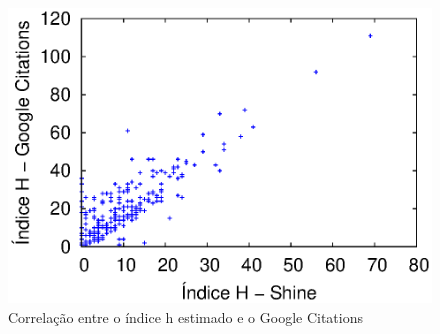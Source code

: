 \begin{figure}[!htb]
\centering
\includegraphics[scale=1]{../graficos/hindex/pt_BR/hindex_scatter_plot.eps}
\caption{Correlação entre o índice h estimado e o Google Citations}
\label{fig:hindex_scatter_plot}
\end{figure}
% 


